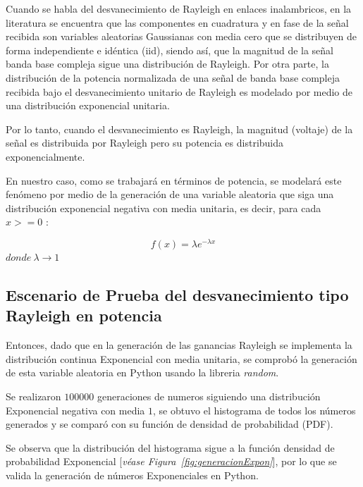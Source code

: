 Cuando se habla del desvanecimiento de Rayleigh en enlaces inalambricos, en la literatura \parencite{RayleighScienceDirect} se encuentra que las componentes en cuadratura y en fase de la señal recibida son variables aleatorias Gaussianas con media cero que se distribuyen de forma independiente e idéntica (iid), siendo así, que la magnitud de la señal banda base compleja sigue una distribución de Rayleigh. Por otra parte, la distribución de la potencia normalizada de una señal de banda base compleja recibida bajo el desvanecimiento unitario de Rayleigh es modelado por medio de una distribución exponencial unitaria.\newline

Por lo tanto, cuando el desvanecimiento es Rayleigh, la magnitud (voltaje) de la señal es distribuida por Rayleigh pero su potencia es distribuida exponencialmente.\newline

En nuestro caso, como se trabajará en términos de potencia, se modelará este fenómeno por medio de la generación de una variable aleatoria que siga una distribución exponencial negativa con media unitaria, es decir, para cada $x>=0$ :

\begin{equation}
    f(x)=\lambda e^{-\lambda x}
\end{equation}
    $donde\ \lambda \to 1$

\subsection{Escenario de Prueba del desvanecimiento tipo Rayleigh en potencia}

Entonces, dado que en la generación de las ganancias Rayleigh se implementa la distribución continua Exponencial con media unitaria, se comprobó la generación de esta variable aleatoria en Python usando la libreria \textit{random}.\newline

Se realizaron $100000$ generaciones de numeros siguiendo una distribución Exponencial negativa con media $1$, se obtuvo el histograma de todos los números generados y se comparó con su función de densidad de probabilidad (PDF).\newline

Se observa que la distribución del histograma sigue a la función densidad de probabilidad Exponencial [\textit{véase Figura~\ref{fig:generacionExpon}}], por lo que se valida la generación de números Exponenciales en Python.\newline

